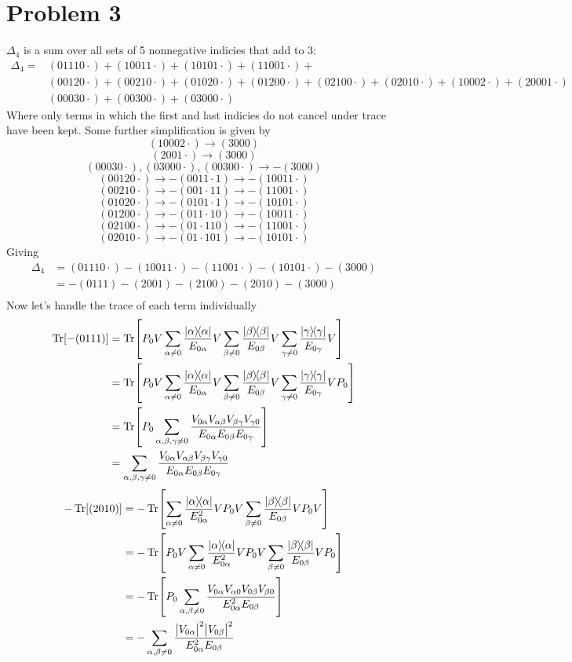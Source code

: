 \documentclass[12pt]{article}
\newcommand{\magsq}[1]{\big|#1\big|^2}
\begin{document}
\section*{Problem 3}
$\Delta_4$ is a sum over all sets of 5 nonnegative indicies that add to 3:
\begin{align*}
    \Delta_4 = &(01110\cdot) + (10011\cdot) + (10101\cdot) + (11001\cdot) + \\
    &(00120\cdot) + (00210\cdot) + (01020\cdot) + (01200\cdot) + (02100\cdot) + (02010\cdot) + (10002\cdot) + (20001\cdot) \\
    &(00030\cdot) + (00300\cdot) + (03000\cdot)
\end{align*}
Where only terms in which the first and last indicies do not cancel under trace have been kept. Some further simplification is given by
\[ (10002\cdot) \to (3000) \]
\[ (2001\cdot) \to (3000) \]
\[ (00030\cdot), (03000\cdot), (00300\cdot) \to -(3000) \]
\[ (00120\cdot) \to -(0011\cdot 1) \to -(10011\cdot) \]
\[ (00210\cdot) \to -(001\cdot 11) \to -(11001\cdot) \]
\[ (01020\cdot) \to -(0101\cdot 1) \to -(10101\cdot) \]
\[ (01200\cdot) \to -(011\cdot 10) \to -(10011\cdot) \]
\[ (02100\cdot) \to -(01\cdot 110) \to -(11001\cdot) \]
\[ (02010\cdot) \to -(01\cdot 101) \to -(10101\cdot) \]
Giving
\begin{align*}
    \Delta_4 &= (01110\cdot) - (10011\cdot) - (11001\cdot) - (10101\cdot) - (3000) \\
    &= -(0111) - (2001) - (2100) - (2010) - (3000) \\
\end{align*}
Now let's handle the trace of each term individually
\begin{align*}
    \Tr[-(0111)] &= \Tr[P_0 V \sum_{\alpha\neq 0}\frac{\dyad{\alpha}}{E_{0\alpha}}V \sum_{\beta\neq 0}\frac{\dyad{\beta}}{E_{0\beta}}V\sum_{\gamma\neq 0}\frac{\dyad{\gamma}}{E_{0\gamma}}V] \\
    &= \Tr[P_0 V \sum_{\alpha\neq 0}\frac{\dyad{\alpha}}{E_{0\alpha}}V \sum_{\beta\neq 0}\frac{\dyad{\beta}}{E_{0\beta}}V\sum_{\gamma\neq 0}\frac{\dyad{\gamma}}{E_{0\gamma}}V P_0] \\
    &= \Tr[P_0\sum_{\alpha,\beta,\gamma\neq 0}\frac{V_{0\alpha}V_{\alpha\beta}V_{\beta\gamma}V_{\gamma 0}}{E_{0\alpha}E_{0\beta}E_{0\gamma}}] \\
    &= \sum_{\alpha,\beta,\gamma\neq 0}\frac{V_{0\alpha}V_{\alpha\beta}V_{\beta\gamma}V_{\gamma 0}}{E_{0\alpha}E_{0\beta}E_{0\gamma}}
\end{align*}
\begin{align*}
    -\Tr[(2010)] &= -\Tr[\sum_{\alpha\neq 0}\frac{\dyad{\alpha}}{E_{0\alpha}^2}VP_0V\sum_{\beta\neq 0}\frac{\dyad{\beta}}{E_{0\beta}}VP_0V] \\
    &= -\Tr[P_0V\sum_{\alpha\neq 0}\frac{\dyad{\alpha}}{E_{0\alpha}^2}VP_0V\sum_{\beta\neq 0}\frac{\dyad{\beta}}{E_{0\beta}}VP_0] \\
    &= -\Tr[P_0\sum_{\alpha,\beta\neq 0}\frac{V_{0\alpha}V_{\alpha 0}V_{0\beta}V_{\beta 0}}{E_{0\alpha}^2E_{0\beta}}] \\
    &= -\sum_{\alpha,\beta\neq 0} \frac{\magsq{V_{0\alpha}}\magsq{V_{0\beta}}}{E_{0\alpha}^2E_{0\beta}}
\end{align*}
\end{document}
